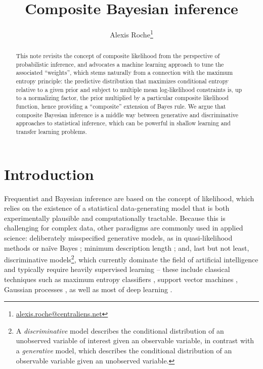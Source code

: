 \documentclass[english]{scrartcl}
\title{Composite Bayesian inference}
\date{}
\author{Alexis Roche\thanks{\url{alexis.roche@centraliens.net}}}
\begin{document}
\maketitle

\begin{abstract}
This note revisits the concept of composite likelihood from the perspective of probabilistic inference, and advocates a machine learning approach to tune the associated ``weights'', which stems naturally from a connection with the maximum entropy principle: the predictive distribution that maximizes conditional entropy relative to a given prior and subject to multiple mean log-likelihood constraints is, up to a normalizing factor, the prior multiplied by a particular composite likelihood function, hence providing a ``composite'' extension of Bayes rule. We argue that composite Bayesian inference is a middle way between generative and discriminative approaches to statistical inference, which can be powerful in shallow learning and transfer learning problems.
\end{abstract}


\section{Introduction}
\label{sec:intro}

Frequentist and Bayesian inference are based on the concept of likelihood, which relies on the existence of a statistical data-generating model that is both experimentally plausible and computationally tractable. Because this is challenging for complex data, other paradigms are commonly used in applied science: deliberately misspecified generative models, as in quasi-likelihood methods \cite{White-82,Walker-13} or na\"ive Bayes \cite{Ng-01}; minimum description length \cite{Grunwald-07}; and, last but not least, discriminative models\footnote{A {\em discriminative} model describes the conditional distribution of an unobserved variable of interest given an observable variable, in contrast with a {\em generative} model, which describes the conditional distribution of an observable variable given an unobserved variable.}, which currently dominate the field of artificial intelligence and typically require heavily supervised learning -- these include classical techniques such as maximum entropy classifiers \cite{BergerA-96}, support vector machines \cite{Vapnik-00}, Gaussian processes \cite{Rasmussen-06}, as well as most of deep learning \cite{Lecun-15,Goodfellow-16}.
\end{document}

